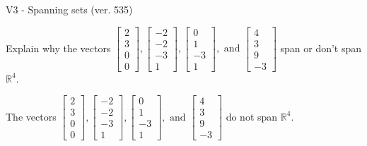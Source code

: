 \begin{exercise}
  \begin{exerciseTitle}V3 - Spanning sets (ver. 535)\end{exerciseTitle}
  \begin{exerciseStatement}
    Explain why the vectors \(\left[\begin{array}{r}
2 \\
3 \\
0 \\
0
\end{array}\right] , \left[\begin{array}{r}
-2 \\
-2 \\
-3 \\
1
\end{array}\right] , \left[\begin{array}{r}
0 \\
1 \\
-3 \\
1
\end{array}\right] , \text{ and } \left[\begin{array}{r}
4 \\
3 \\
9 \\
-3
\end{array}\right]\) span or don't span \(\mathbb{R}^4\). 
	


  \end{exerciseStatement}
  \begin{exerciseAnswer}
   The vectors \(\left[\begin{array}{r}
2 \\
3 \\
0 \\
0
\end{array}\right] , \left[\begin{array}{r}
-2 \\
-2 \\
-3 \\
1
\end{array}\right] , \left[\begin{array}{r}
0 \\
1 \\
-3 \\
1
\end{array}\right] , \text{ and } \left[\begin{array}{r}
4 \\
3 \\
9 \\
-3
\end{array}\right]\) 
  	 do not  
	span \(\mathbb{R}^4\).
  


  \end{exerciseAnswer}
\end{exercise}
